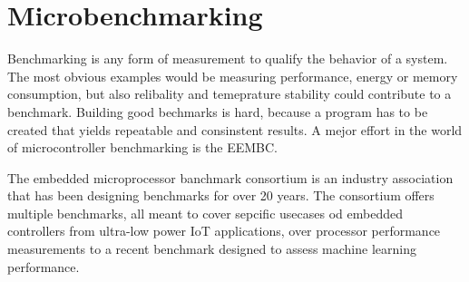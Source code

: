 \section{Microbenchmarking}
Benchmarking is any form of measurement to qualify the behavior of a system. The most obvious examples would be measuring performance, energy or memory consumption, but also relibality and temeprature stability could contribute to a benchmark. Building good bechmarks is hard, because a program has to be created that yields repeatable and consinstent results. A mejor effort in the world of microcontroller benchmarking is the EEMBC.

The embedded microprocessor banchmark consortium is an industry association that has been designing benchmarks for over 20 years. The consortium offers multiple benchmarks, all meant to cover sepcific usecases od embedded controllers from ultra-low power IoT applications, over processor performance measurements to a recent benchmark designed to assess machine learning performance.